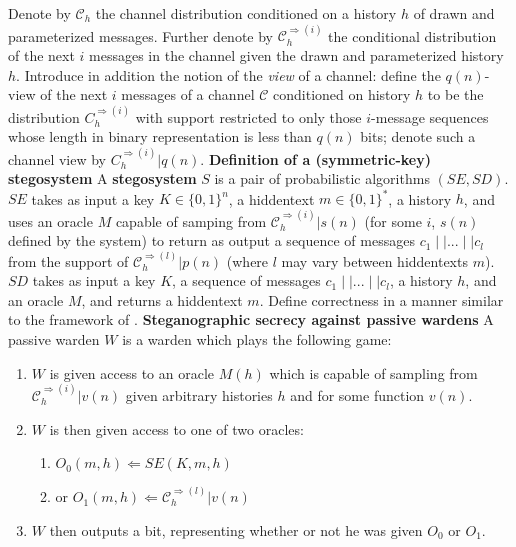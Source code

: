 \documentclass{article}
\begin{document}
Denote by $\mathcal{C}_h$ the channel distribution conditioned on a history $h$ of drawn and parameterized messages.  Further denote by 
$\mathcal{C}_h^{\Rightarrow(i)}$ the conditional distribution of the next $i$ messages in the channel given the drawn and parameterized 
history $h$.  Introduce in addition the notion of the \textit{view} of a channel: define the $q(n)$-view of the next $i$ messages 
of a channel $\mathcal{C}$ conditioned on history $h$ to be the distribution $C_h^{\Rightarrow(i)}$ with support restricted to only 
those $i$-message sequences whose length in binary representation is less than $q(n)$ bits; denote such a channel view by 
$C_h^{\Rightarrow(i)} \big\vert q(n)$.
\newline\newline
\noindent \textbf{Definition of a (symmetric-key) stegosystem }  A \textbf{stegosystem} $S$ is a pair of probabilistic algorithms
$(SE, SD)$.  $SE$ takes as input a key $K \in \{0,1\}^n$, a hiddentext $m \in \{0,1\}^*$, a history $h$, and uses an oracle $M$ capable of 
samping from $\mathcal{C}_h^{\Rightarrow(i)} \big\vert s(n)$ (for some $i$, $s(n)$ defined by the system) to return as output a sequence of messages 
$c_1 \mid \mid ... \mid \mid c_l$ from the support of $\mathcal{C}_h^{\Rightarrow(l)} \big\vert p(n)$ (where $l$ may vary between hiddentexts $m$).  
$SD$ takes as input a key $K$, a sequence of messages $c_1 \mid \mid ... \mid \mid c_l$, a history $h$, and an oracle $M$, and returns 
a hiddentext $m$.  Define correctness in a manner similar to the framework of \cite{BiglouPSS}.
\newline\newline
\noindent \textbf{Steganographic secrecy against passive wardens }  A passive warden $W$ is a warden which plays the following game:

\begin{enumerate}
\item{$W$ is given access to an oracle $M(h)$ which is capable of sampling from $\mathcal{C}_h^{\Rightarrow(i)} \big\vert v(n)$ given 
arbitrary histories $h$ and for some function $v(n)$.}
\item{$W$ is then given access to one of two oracles: }
\begin{enumerate}
\item{$O_0(m,h) \Leftarrow SE(K,m,h)$}
\item{or $O_1(m,h) \Leftarrow \mathcal{C}_h^{\Rightarrow(l)} \big\vert v(n)$}
\end{enumerate}
\item{$W$ then outputs a bit, representing whether or not he was given $O_0$ or $O_1$.}
\end{enumerate}
\end{document}
